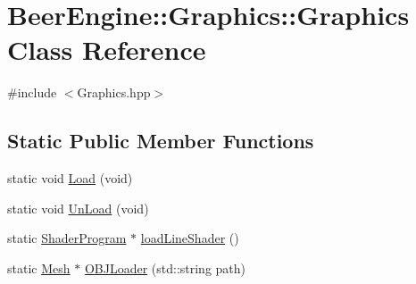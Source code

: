 \hypertarget{class_beer_engine_1_1_graphics_1_1_graphics}{}\section{Beer\+Engine\+:\+:Graphics\+:\+:Graphics Class Reference}
\label{class_beer_engine_1_1_graphics_1_1_graphics}


{\ttfamily \#include $<$Graphics.\+hpp$>$}

\subsection*{Static Public Member Functions}
\begin{DoxyCompactItemize}
\item 
static void \mbox{\hyperlink{class_beer_engine_1_1_graphics_1_1_graphics_a87ad2f3a98b4fa5fd453589f7f023701}{Load}} (void)
\item 
static void \mbox{\hyperlink{class_beer_engine_1_1_graphics_1_1_graphics_ab42d214b5a3f69614ad5b9c30d506619}{Un\+Load}} (void)
\item 
static \mbox{\hyperlink{class_beer_engine_1_1_graphics_1_1_shader_program}{Shader\+Program}} $\ast$ \mbox{\hyperlink{class_beer_engine_1_1_graphics_1_1_graphics_a385cbcbf514ef7c22cb4a0ed6f577908}{load\+Line\+Shader}} ()
\item 
static \mbox{\hyperlink{class_beer_engine_1_1_graphics_1_1_mesh}{Mesh}} $\ast$ \mbox{\hyperlink{class_beer_engine_1_1_graphics_1_1_graphics_a0b9081ae33ab8eb0a166c49f70d907ef}{O\+B\+J\+Loader}} (std\+::string path)
\end{DoxyCompactItemize}
